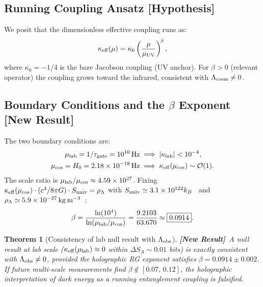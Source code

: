 \documentclass[12pt]{article}
\newtheorem{theorem}{Theorem}
\newcommand{\hypothesis}{\textbf{[Hypothesis]}}
\newcommand{\newresult}{\textbf{[New Result]}}
\begin{document}
\subsection{Running Coupling Ansatz \hypothesis}

We posit that the dimensionless effective coupling runs as:
\begin{equation}
\kappa_{\rm eff}(\mu) = \kappa_0\left(\frac{\mu}{\mu_{\rm UV}}\right)^{\!\beta},
\label{eq:running}
\end{equation}
where $\kappa_0 = -1/4$ is the bare Jacobson coupling (UV anchor). For $\beta > 0$
(relevant operator) the coupling grows toward the infrared, consistent with
$\Lambda_{\rm cosm} \ne 0$.

\subsection{Boundary Conditions and the $\beta$ Exponent \newresult}

The two boundary conditions are:
\begin{align}
\mu_{\rm lab} = 1/\tau_{\rm gate} = 10^{10}\,{\rm Hz}
&\implies |\kappa_{\rm lab}| < 10^{-4},
\label{eq:BC_lab}\\
\mu_{\rm cos} = H_0 = 2.18\times 10^{-18}\,{\rm Hz}
&\implies \kappa_{\rm eff}(\mu_{\rm cos}) \sim \mathcal{O}(1).
\label{eq:BC_cos}
\end{align}
The scale ratio is $\mu_{\rm lab}/\mu_{\rm cos} \approx 4.59\times 10^{27}$.
Fixing $\kappa_{\rm eff}(\mu_{\rm cos})\cdot(c^4/8\pi G)\cdot S_{\rm univ} = \rho_\Lambda$
with $S_{\rm univ} \simeq 3.1\times 10^{122}k_B$~\cite{Susskind2007} and
$\rho_\Lambda \simeq 5.9\times 10^{-27}\,{\rm kg\,m^{-3}}$~\cite{Planck2020}:
\begin{equation}
\beta = \frac{\ln(10^4)}{\ln(\mu_{\rm lab}/\mu_{\rm cos})}
= \frac{9.2103}{63.670}
\approx \boxed{0.0914}.
\label{eq:beta}
\end{equation}

\begin{theorem}[Consistency of lab null result with $\Lambda_{\rm obs}$]
\label{thm:RG_consistency}
\newresult\ A null result at lab scale ($\kappa_{\rm eff}(\mu_{\rm lab}) \approx 0$
within $\Delta S_A \sim 0.01$ bits) is exactly consistent with $\Lambda_{\rm obs} \ne 0$,
provided the holographic RG exponent satisfies $\beta = 0.0914 \pm 0.002$.
If future multi-scale measurements find $\beta \notin [0.07,\,0.12]$, the holographic
interpretation of dark energy as a running entanglement coupling is falsified.
\end{theorem}
\end{document}
